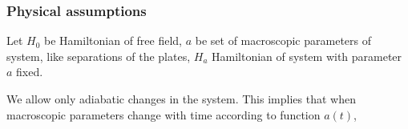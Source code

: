 \documentclass[10pt,t]{beamer}
\begin{document}
\begin{frame}
  \frametitle{Physical assumptions}


  Let $H_{ 0 }$ be Hamiltonian of free field, $a$ be set of
  macroscopic parameters of system, like separations of the plates,
  $H_{ a }$ Hamiltonian of system with parameter $a$ fixed.

  We allow only adiabatic changes in the system. This implies that
  when macroscopic parameters change with time according to function
  $a( t )$,

\end{frame}










\appendix















% 







\end{document}
